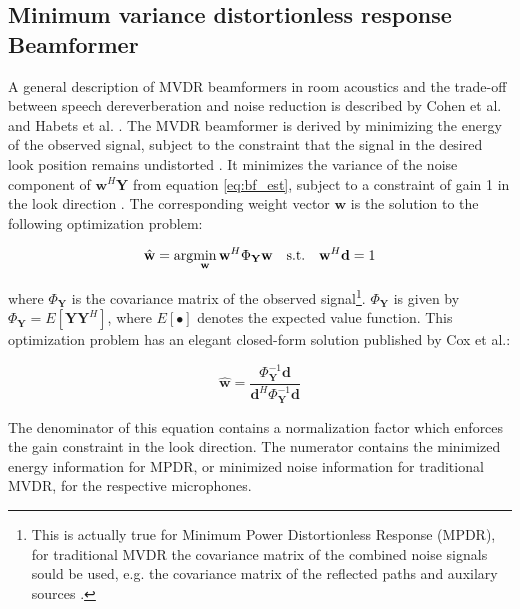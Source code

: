 \subsection{Minimum variance distortionless response Beamformer}
\label{sec:des_mvdr}
A general description of MVDR beamformers in room acoustics and the trade-off between speech dereverberation and noise reduction is described by Cohen et al.\cite{habetsspeech2010} and Habets et al. \cite{habetsroom2010}. The MVDR beamformer is derived by minimizing the energy of the observed signal, subject to the constraint that the signal in the desired look position remains undistorted \cite{vanveen1988}. It minimizes the variance of the noise component of $\textbf{w}^{H}\textbf{Y}$ from equation \ref{eq:bf_est}, subject to a constraint of gain 1 in the look direction \cite{ba2007}. The corresponding weight vector $\textbf{w}$ is the solution to the following optimization problem:

\begin{equation}
\hat{\textbf{w}} = \arg\!\min_\textbf{w} \textbf{w}^H \Phi_\textbf{Y} \textbf{w} \quad\textrm{s.t.}\quad\textbf{w}^H\textbf{d} = 1
\end{equation}


where $\Phi_\textbf{Y}$ is the covariance matrix of the observed signal\footnote{This is actually true for Minimum Power Distortionless Response (MPDR), for traditional MVDR the covariance matrix of the combined noise signals sould be used, e.g. the covariance matrix of the reflected paths and auxilary sources \cite{gannot2010}.}. $\Phi_\textbf{Y}$ is given by $\Phi_\textbf{Y} = E[\textbf{YY}^H]$, where $E[\bullet]$ denotes the expected value function. This optimization problem has an elegant closed-form solution published by Cox et al.\cite{cox1987}:

\begin{equation}
\label{eq:cox}
\hat{\textbf{w}} = \frac{\Phi_{\textbf{Y}}^{-1}\textbf{d}}{\textbf{d}^{H}\Phi_{\textbf{Y}}^{-1}\textbf{d}}
\end{equation}

The denominator of this equation contains a normalization factor which enforces the gain constraint in the look direction. The numerator contains the minimized energy information for MPDR, or minimized noise information for traditional MVDR, for the respective microphones.

